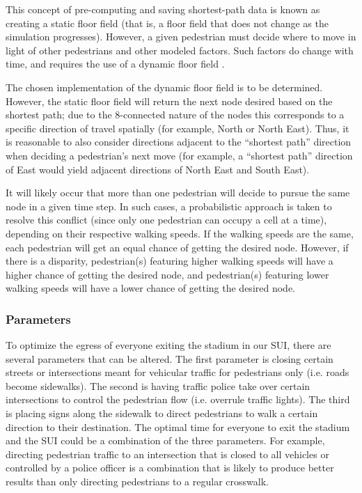 \documentclass[12pt]{article}
\begin{document}
This concept of pre-computing and saving shortest-path data is known as creating
a static floor field (that is, a floor field that does not change as the
simulation progresses). However, a given pedestrian must decide where to move
in light of other pedestrians and other modeled factors. Such factors do change
with time, and requires the use of a dynamic floor field
\cite{burstedde2001simulation}.

The chosen implementation of the dynamic floor field is to be determined.
However, the static floor field will return the next node desired based on the
shortest path; due to the 8-connected nature of the nodes this corresponds
to a specific direction of travel spatially (for example, North or North East).
Thus, it is reasonable to also consider directions adjacent to the “shortest
path” direction when deciding a pedestrian’s next move (for example, a “shortest
path” direction of East would yield adjacent directions of North East and
South East).

It will likely occur that more than one pedestrian will decide to pursue the
same node in a given time step. In such cases, a probabilistic approach is taken
to resolve this conflict (since only one pedestrian can occupy a cell at a
time), depending on their respective walking speeds. If the walking speeds are
the same, each pedestrian will get an equal chance of getting the desired node.
However, if there is a disparity, pedestrian(s) featuring higher walking speeds
will have a higher chance of getting the desired node, and pedestrian(s)
featuring lower walking speeds will have a lower chance of getting the desired
node.

\subsubsection{Parameters}

To optimize the egress of everyone exiting the stadium in our SUI, there are
several parameters that can be altered. The first parameter is closing certain
streets or intersections meant for vehicular traffic for pedestrians only (i.e.
roads become sidewalks). The second is having traffic police take over certain
intersections to control the pedestrian flow (i.e. overrule traffic lights).
The third is placing signs along the sidewalk to direct pedestrians to walk a
certain direction to their destination. The optimal time for everyone to exit
the stadium and the SUI could be a combination of the three parameters.
For example, directing pedestrian traffic to an intersection that is closed to
all vehicles or controlled by a police officer is a combination that is likely
to produce better results than only directing pedestrians to a regular
crosswalk.
\end{document}
